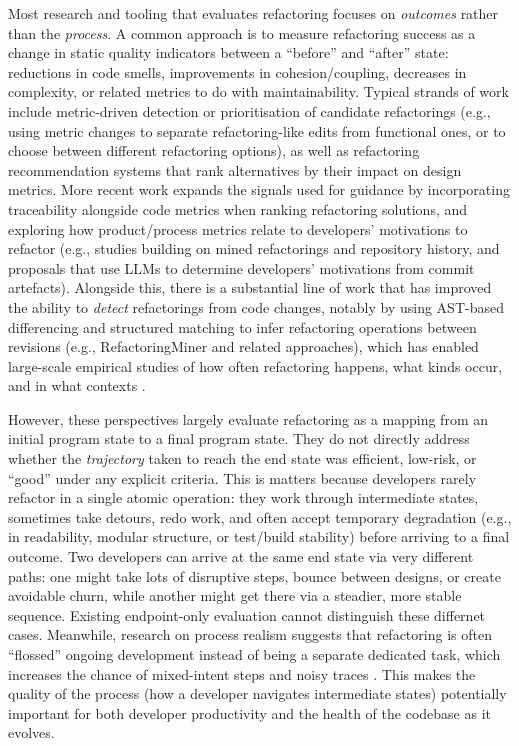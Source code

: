 Most research and tooling that evaluates refactoring focuses on \textit{outcomes} rather than the \textit{process}. A common approach is to measure refactoring success as a change in static quality indicators between a “before” and “after” state: reductions in code smells, improvements in cohesion/coupling, decreases in complexity, or related metrics to do with maintainability. Typical strands of work include metric-driven detection or prioritisation of candidate refactorings (e.g., using metric changes to separate refactoring-like edits from functional ones, or to choose between different refactoring options), as well as refactoring recommendation systems that rank alternatives by their impact on design metrics. More recent work expands the signals used for guidance by incorporating traceability alongside code metrics when ranking refactoring solutions, and exploring how product/process metrics relate to developers’ motivations to refactor (e.g., studies building on mined refactorings and repository history, and proposals that use LLMs to determine developers' motivations from commit artefacts). Alongside this, there is a substantial line of work that has improved the ability to \textit{detect} refactorings from code changes, notably by using AST-based differencing and structured matching to infer refactoring operations between revisions (e.g., RefactoringMiner and related approaches), which has enabled large-scale empirical studies of how often refactoring happens, what kinds occur, and in what contexts \cite{tsantalis2018refactoringminer,tsantalis2020refactoringminer,falleri2014gumtree}.

However, these perspectives largely evaluate refactoring as a mapping from an initial program state to a final program state. They do not directly address whether the \textit{trajectory} taken to reach the end state was efficient, low-risk, or “good” under any explicit criteria. This is matters because developers rarely refactor in a single atomic operation: they work through intermediate states, sometimes take detours, redo work, and often accept temporary degradation (e.g., in readability, modular structure, or test/build stability) before arriving to a final outcome. Two developers can arrive at the same end state via very different paths: one might take lots of disruptive steps, bounce between designs, or create avoidable churn, while another might get there via a steadier, more stable sequence. Existing endpoint-only evaluation cannot distinguish these differnet cases. Meanwhile, research on process realism suggests that refactoring is often “flossed” ongoing development instead of being a separate dedicated task, which increases the chance of mixed-intent steps and noisy traces \cite{murphyhill2009howrefactor}. This makes the quality of the process (how a developer navigates intermediate states) potentially important for both developer productivity and the health of the codebase as it evolves.

